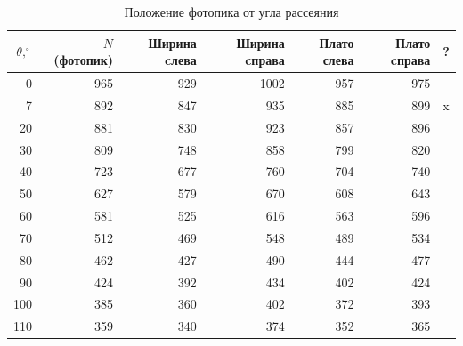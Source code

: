 \documentclass[12pt,a4paper]{article}
\begin{document}
	\begin{table}[h]
		\centering
		\begin{tabular}{rrrrrrl}
			$\theta, ^{\circ}$ & $N$ (фотопик) & Ширина cлева & Ширина cправа & Плато слева & Плато cправа & ?\\[0pt]
			\hline
			0 & 965 & 929 & 1002 & 957 & 975 & \\[0pt]
			7 & 892 & 847 & 935 & 885 & 899 & x\\[0pt]
			20 & 881 & 830 & 923 & 857 & 896 & \\[0pt]
			30 & 809 & 748 & 858 & 799 & 820 & \\[0pt]
			40 & 723 & 677 & 760 & 704 & 740 & \\[0pt]
			50 & 627 & 579 & 670 & 608 & 643 & \\[0pt]
			60 & 581 & 525 & 616 & 563 & 596 & \\[0pt]
			70 & 512 & 469 & 548 & 489 & 534 & \\[0pt]
			80 & 462 & 427 & 490 & 444 & 477 & \\[0pt]
			90 & 424 & 392 & 434 & 402 & 424 & \\[0pt]
			100 & 385 & 360 & 402 & 372 & 393 & \\[0pt]
			110 & 359 & 340 & 374 & 352 & 365 & \\[0pt]
			\hline
		\end{tabular}
		\label{tab:measurements}
		\caption{Положение фотопика от угла рассеяния}
		
	\end{table}
	
\end{document}
